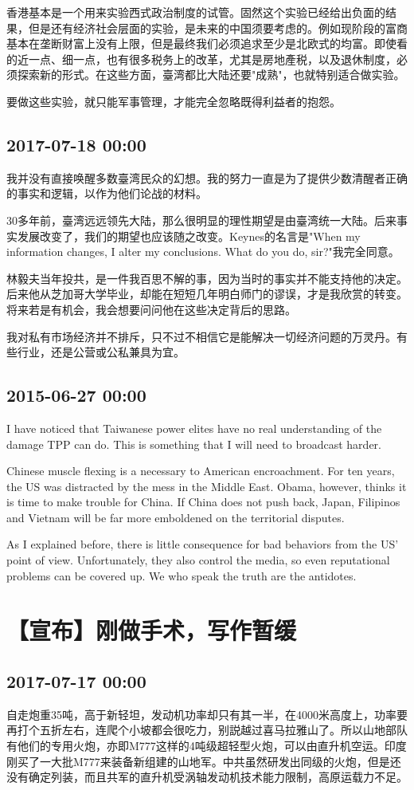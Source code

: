 \documentclass[twocolumn]{ctexart}
\begin{document}
香港基本是一个用来实验西式政治制度的试管。固然这个实验已经给出负面的结果，但是还有经济社会层面的实验，是未来的中国须要考虑的。例如现阶段的富商基本在垄断财富上没有上限，但是最终我们必须追求至少是北欧式的均富。即使看的近一点、细一点，也有很多税务上的改革，尤其是房地產税，以及退休制度，必须探索新的形式。在这些方面，臺湾都比大陆还要"成熟"，也就特别适合做实验。

要做这些实验，就只能军事管理，才能完全忽略既得利益者的抱怨。\subsection*{2017-07-18 00:00}
我并没有直接唤醒多数臺湾民众的幻想。我的努力一直是为了提供少数清醒者正确的事实和逻辑，以作为他们论战的材料。

30多年前，臺湾远远领先大陆，那么很明显的理性期望是由臺湾统一大陆。后来事实发展改变了，我们的期望也应该随之改变。Keynes的名言是"When my information changes, I alter my conclusions. What do you do, sir?"我完全同意。

林毅夫当年投共，是一件我百思不解的事，因为当时的事实并不能支持他的决定。后来他从芝加哥大学毕业，却能在短短几年明白师门的谬误，才是我欣赏的转变。将来若是有机会，我会想要问问他在这些决定背后的思路。

我对私有市场经济并不排斥，只不过不相信它是能解决一切经济问题的万灵丹。有些行业，还是公营或公私兼具为宜。\subsection*{2015-06-27 00:00}
I have noticed that Taiwanese power elites have no real understanding of the damage TPP can do. This is something that I will need to broadcast harder.

Chinese muscle flexing is a necessary to American encroachment. For ten years, the US was distracted by the mess in the Middle East. Obama, however, thinks it is time to make trouble for China. If China does not push back, Japan, Filipinos and Vietnam will be far more emboldened on the territorial disputes.

As I explained before, there is little consequence for bad behaviors from the US' point of view. Unfortunately, they also control the media, so even reputational problems can be covered up. We who speak the truth are the antidotes.\section*{【宣布】刚做手术，写作暂缓}
\subsection*{2017-07-17 00:00}
自走炮重35吨，高于新轻坦，发动机功率却只有其一半，在4000米高度上，功率要再打个五折左右，连爬个小坡都会很吃力，别説越过喜马拉雅山了。所以山地部队有他们的专用火炮，亦即M777这样的4吨级超轻型火炮，可以由直升机空运。印度刚买了一大批M777来装备新组建的山地军。中共虽然研发出同级的火炮，但是还没有确定列装，而且共军的直升机受涡轴发动机技术能力限制，高原运载力不足。
\end{document}
